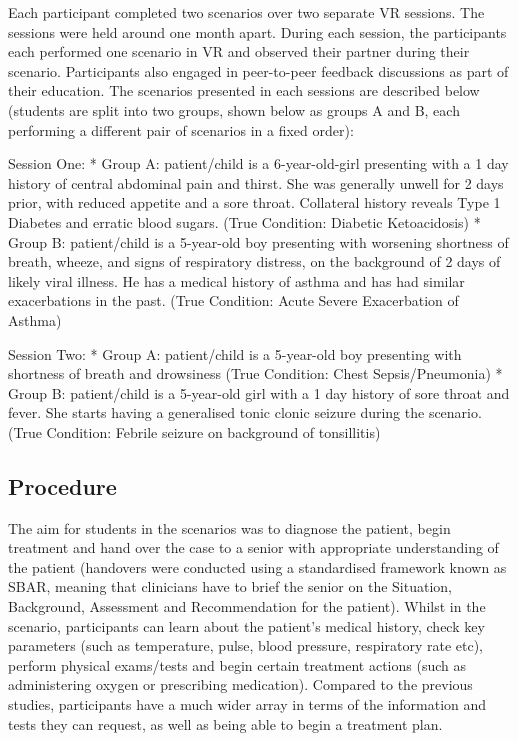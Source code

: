 \documentclass[a4paper, nobind]{templates/ociamthesis}
\begin{document}
Each participant completed two scenarios over two separate VR sessions. The sessions were held around one month apart. During each session, the participants each performed one scenario in VR and observed their partner during their scenario. Participants also engaged in peer-to-peer feedback discussions as part of their education. The scenarios presented in each sessions are described below (students are split into two groups, shown below as groups A and B, each performing a different pair of scenarios in a fixed order):

Session One:
* Group A: patient/child is a 6-year-old-girl presenting with a 1 day history of central abdominal pain and thirst. She was generally unwell for 2 days prior, with reduced appetite and a sore throat. Collateral history reveals Type 1 Diabetes and erratic blood sugars. (True Condition: Diabetic Ketoacidosis)
* Group B: patient/child is a 5-year-old boy presenting with worsening shortness of breath, wheeze, and signs of respiratory distress, on the background of 2 days of likely viral illness. He has a medical history of asthma and has had similar exacerbations in the past. (True Condition: Acute Severe Exacerbation of Asthma)

Session Two:
* Group A: patient/child is a 5-year-old boy presenting with shortness of breath and drowsiness (True Condition: Chest Sepsis/Pneumonia)
* Group B: patient/child is a 5-year-old girl with a 1 day history of sore throat and fever. She starts having a generalised tonic clonic seizure during the scenario. (True Condition: Febrile seizure on background of tonsillitis)

\hypertarget{procedure-2}{%
\subsection*{Procedure}\label{procedure-2}}

The aim for students in the scenarios was to diagnose the patient, begin treatment and hand over the case to a senior with appropriate understanding of the patient (handovers were conducted using a standardised framework known as SBAR, meaning that clinicians have to brief the senior on the Situation, Background, Assessment and Recommendation for the patient). Whilst in the scenario, participants can learn about the patient's medical history, check key parameters (such as temperature, pulse, blood pressure, respiratory rate etc), perform physical exams/tests and begin certain treatment actions (such as administering oxygen or prescribing medication). Compared to the previous studies, participants have a much wider array in terms of the information and tests they can request, as well as being able to begin a treatment plan.
\end{document}
